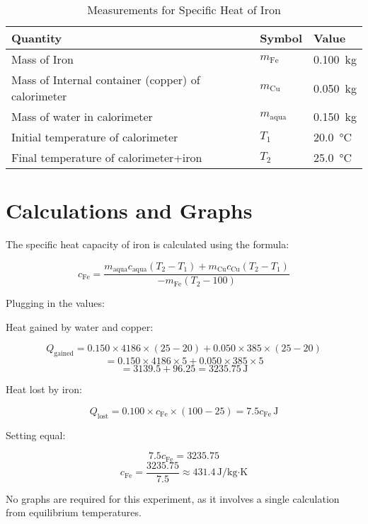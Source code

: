 \documentclass[12pt, a4paper]{article}
\begin{document}
\begin{small}
	\begin{longtable}{|l|l|l|}
		\caption{Measurements for Specific Heat of Iron} \label{tab:measurements} \\
		\hline
		\textbf{Quantity} & \textbf{Symbol} & \textbf{Value} \\
		\hline
		Mass of Iron & $m_{\text{Fe}}$ & \SI{0.100}{\kilo\gram} \\
		Mass of Internal container (copper) of calorimeter & $m_{\text{Cu}}$ & \SI{0.050}{\kilo\gram} \\
		Mass of water in calorimeter & $m_{\text{aqua}}$ & \SI{0.150}{\kilo\gram} \\
		Initial temperature of calorimeter & $T_1$ & \SI{20.0}{\celsius} \\
		Final temperature of calorimeter+iron & $T_2$ & \SI{25.0}{\celsius} \\
		\hline
	\end{longtable}
\end{small}

\section{Calculations and Graphs}
The specific heat capacity of iron is calculated using the formula:

\[ c_{\text{Fe}} = \frac{m_{\text{aqua}} c_{\text{aqua}} (T_2 - T_1) + m_{\text{Cu}} c_{\text{Cu}} (T_2 - T_1)}{-m_{\text{Fe}} (T_2 - 100)} \]

Plugging in the values:

Heat gained by water and copper:

\[ Q_{\text{gained}} = 0.150 \times 4186 \times (25 - 20) + 0.050 \times 385 \times (25 - 20) \]
\[ = 0.150 \times 4186 \times 5 + 0.050 \times 385 \times 5 \]
\[ = 3139.5 + 96.25 = 3235.75 \, \text{J} \]

Heat lost by iron:

\[ Q_{\text{lost}} = 0.100 \times c_{\text{Fe}} \times (100 - 25) = 7.5 c_{\text{Fe}} \, \text{J} \]

Setting equal:

\[ 7.5 c_{\text{Fe}} = 3235.75 \]
\[ c_{\text{Fe}} = \frac{3235.75}{7.5} \approx 431.4 \, \text{J/kg·K} \]

No graphs are required for this experiment, as it involves a single calculation from equilibrium temperatures.
\end{document}
